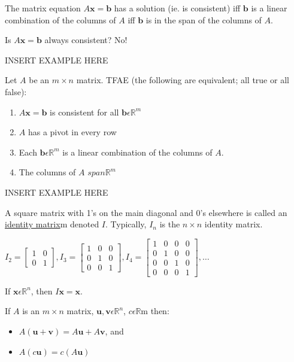 \documentclass{report}
\begin{document}
\begin{proposition}
	The matrix equation $A\mathbf{x}=\mathbf{b}$ has a solution (ie. is consistent) iff $\mathbf{b}$ is a linear combination of the columns of $A$ iff $\mathbf{b}$ is in the span of the columns of $A$.
\end{proposition}
Is $A\mathbf{x}=\mathbf{b}$ always consistent? No!
\begin{example}
	INSERT EXAMPLE HERE
\end{example}
\begin{theorem}
	Let $A$ be an $m\times n$ matrix. TFAE (the following are equivalent; all true or all false):
	\begin{enumerate}
		\item $A\mathbf{x}=\mathbf{b}$ is consistent for all $\mathbf{b}\epsilon \mathbb{R}^m$
		\item $A$ has a pivot in every row
		\item Each $\mathbf{b}\epsilon \mathbb{R}^m$ is a linear combination of the columns of $A$.
		\item The columns of $A$ $span\mathbb{R}^m$
	\end{enumerate}
\end{theorem}
\begin{example}
	INSERT EXAMPLE HERE
\end{example}
\begin{definition}
	A square matrix with 1's on the main diagonal and 0's elsewhere is called an \underline{identity matrix}m denoted $I$. Typically, $I_n$ is the $n\times n$ identity matrix.
	\begin{center}
		$I_2 = \begin{bmatrix}
			1 & 0 \\
			0 & 1
		\end{bmatrix},
		I_3 = \begin{bmatrix}
			1 & 0 & 0 \\
			0 & 1 & 0 \\
			0 & 0 & 1
		\end{bmatrix},
		I_4 = \begin{bmatrix}
			1 & 0 & 0 & 0 \\
			0 & 1 & 0 & 0 \\
			0 & 0 & 1 & 0 \\
			0 & 0 & 0 & 1 
		\end{bmatrix},
		\ldots$
	\end{center}
\end{definition}
\begin{proposition}
	If $\mathbf{x}\epsilon \mathbb{R}^n$, then $I\mathbf{x} = \mathbf{x}$.
\end{proposition}
\begin{theorem}
	If $A$ is an $m\times n$ matrix, $\mathbf{u}, \mathbf{v}\epsilon \mathbb{R}^n$, $c\epsilon \mathbb{R}$m then:
	\begin{itemize}
		\item $A(\mathbf{u}+\mathbf{v}) = A\mathbf{u}+A\mathbf{v}$, and
		\item $A(c\mathbf{u}) = c(A\mathbf{u})$
	\end{itemize}
\end{theorem}
\end{document}
